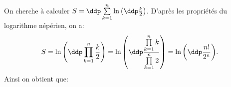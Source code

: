 \begin{correction}  \; 
On cherche \`{a} calculer $S=\ddp \sum\limits_{k=1}^n \ln{\left( \ddp\frac{k}{2}  \right)}$.  D'apr\`{e}s les propri\'et\'es du logarithme n\'ep\'erien, on a: 
$$S=\ln{\left( \ddp \prod\limits_{k=1}^n \frac{k}{2} \right)} = \ln{\left( \ddp \frac{\prod\limits_{k=1}^n k}{\prod\limits_{k=1}^n 2}  \right)} =  \ln{\left( \ddp \frac{n!}{2^n}\right)}.$$
Ainsi on obtient que: 
\end{correction}

